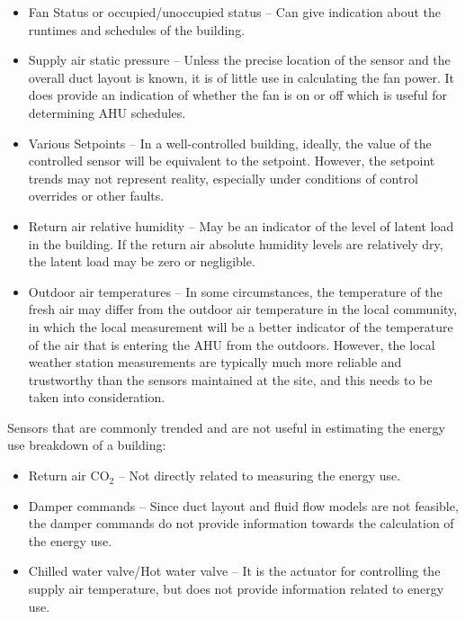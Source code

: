 \begin{itemize}
\item Fan Status or occupied/unoccupied status -- Can give indication about the runtimes and schedules of the building.
\item Supply air static pressure -- Unless the precise location of the
    sensor and the overall duct layout is known, it is of little use in
    calculating the fan power. It does provide an indication of whether the
    fan is on or off which is useful for determining AHU schedules.
\item Various Setpoints -- In a well-controlled building, ideally, the
    value of the controlled sensor will be equivalent to the setpoint.
    However, the setpoint trends may not represent reality, especially
    under conditions of control overrides or other faults.
\item Return air relative humidity -- May be an indicator of the level of latent load in the building. If the return air absolute humidity levels are relatively dry, the latent load may be zero or negligible. 
\item Outdoor air temperatures -- In some circumstances, the temperature
    of the fresh air may differ from the outdoor air temperature in the
    local community, in which the local measurement will be a better
    indicator of the temperature of the air that is entering the AHU
    from the outdoors. However, the local weather station measurements
    are typically much more reliable and trustworthy than the sensors
    maintained at the site, and this needs to be taken into
    consideration.
\end{itemize}

Sensors that are commonly trended and are not useful in estimating the energy use breakdown of a building:
\begin{itemize}
\item Return air CO\(_2\) -- Not directly related to measuring the energy use.
\item Damper commands -- Since duct layout and fluid flow models are not feasible, the damper commands do not provide information towards the calculation of the energy use. 
\item Chilled water valve/Hot water valve -- It is the actuator for controlling the supply air temperature, but does not provide information related to energy use.
\end{itemize}





